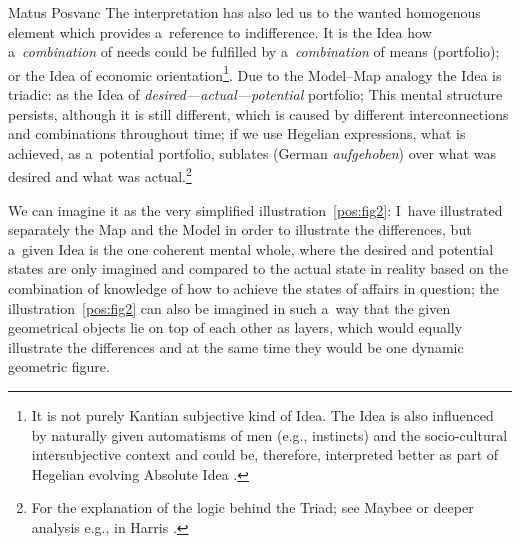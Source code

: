 \begin{artengenv}{Matus Posvanc}
The interpretation has also led us to the wanted homogenous element which provides a~reference to indifference. It is the Idea how a~\textit{combination} of needs could be fulfilled by a~\textit{combination} of means (portfolio); or the Idea of economic orientation\footnote{It is not purely Kantian subjective kind of Idea. The Idea is also influenced by naturally given automatisms of men (e.g., instincts) and the socio-cultural intersubjective context and could be, therefore, interpreted better as part of Hegelian evolving Absolute Idea 
\parencite[see interpretation of Hegelian logic by][]{Harris1983Interpretation}. %
 }. Due to the Model–Map analogy the Idea is triadic: as the Idea of \textit{desired---actual---potential} portfolio; This mental structure persists, although it is still different, which is caused by different interconnections and combinations throughout time; if we use Hegelian expressions, what is achieved, as a~potential portfolio, sublates (German \textit{aufgehoben}) over what was desired and what was actual.\footnote{For the explanation of the logic behind the Triad; see Maybee 
\parencite*[][]{Maybee2020Hegels} %
 or deeper analysis e.g., in Harris 
\parencite*[][]{Harris1983Interpretation}.%
}



We can imagine it as the very simplified illustration~\ref{pos:fig2}: I~have illustrated separately the Map and the Model in order to illustrate the differences, but a~given Idea is the one coherent mental whole, where the desired and potential states are only imagined and compared to the actual state in reality based on the combination of knowledge of how to achieve the states of affairs in question; the illustration~\ref{pos:fig2} can also be imagined in such a~way that the given geometrical objects lie on top of each other as layers, which would equally illustrate the differences and at the same time they would be one dynamic geometric figure.



\end{artengenv}
